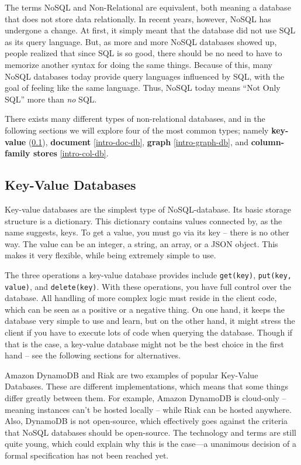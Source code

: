 The terms NoSQL and Non-Relational are equivalent, both meaning a database that
does not store data relationally. In recent years, however, NoSQL has undergone
a change. At first, it simply meant that the database did not use SQL as its
query language. But, as more and more NoSQL databases showed up, people realized
that since SQL is so good, there should be no need to have to memorize another
syntax for doing the same things. Because of this, many NoSQL databases today
provide query languages influenced by SQL, with the goal of feeling like the
same language. Thus, NoSQL today means ``Not Only SQL'' more than \emph{no} SQL.

There exists many different types of non-relational databases, and in the
following sections we will explore four of the most common types; namely
\textbf{key-value} (\ref{intro-kv-db}), \textbf{document} \ref{intro-doc-db},
\textbf{graph} \ref{intro-graph-db}, and \textbf{column-family stores}
\ref{intro-col-db}.

\subsection{Key-Value Databases}
\label{intro-kv-db}
Key-value databases are the simplest type of NoSQL-database. Its basic storage
structure is a dictionary. This dictionary contains values connected by, as the
name suggests, keys. To get a value, you must go via its key -- there is no
other way. The value can be an integer, a string, an array, or a JSON object.
This makes it very flexible, while being extremely simple to use. 

The three operations a key-value database provides include \texttt{get(key)},
\texttt{put(key, value)}, and \texttt{delete(key)}. With these operations, you
have full control over the database. All handling of more complex logic must
reside in the client code, which can be seen as a positive or a negative thing.
On one hand, it keeps the database very simple to use and learn, but on the
other hand, it might stress the client if you have to execute lots of code when
querying the database. Though if that is the case, a key-value database might
not be the best choice in the first hand -- see the following sections for
alternatives.

Amazon DynamoDB and Riak are two examples of popular Key-Value Databases. These
are different implementations, which means that some things differ greatly
between them. For example, Amazon DynamoDB is cloud-only -- meaning instances
can't be hosted locally -- while Riak can be hosted anywhere. Also, DynamoDB is
not open-source, which effectively goes against the criteria that NoSQL
databases should be open-source. The technology and terms are still quite young,
which could explain why this is the case---a unanimous decision of a formal
specification has not been reached yet.


